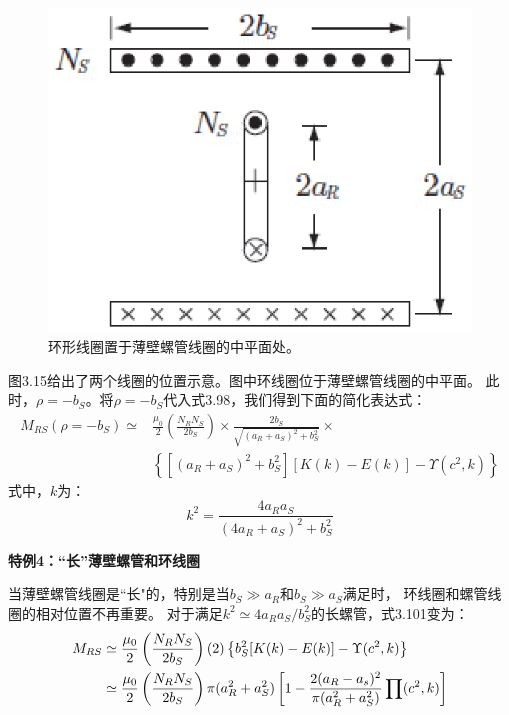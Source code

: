 \begin{figure}[htbp]
	\centering
	\includegraphics[scale=0.7]{chpt3/figs/fig3.15.eps}
	\caption{环形线圈置于薄壁螺管线圈的中平面处。}
\end{figure}

图3.15给出了两个线圈的位置示意。图中环线圈位于薄壁螺管线圈的中平面。
此时，$\rho=-b_S$。将$\rho=-b_S$代入式3.98，我们得到下面的简化表达式：
  \begin{equation}
  \begin{split}
M_{RS}(\rho=-b_S)\simeq & \frac{\mu_0}{2}\left(\frac{N_R N_S}{2b_S}\right)\times\frac{2b_S}{\sqrt{(a_R+a_S)^2+b_S^2}}\times\\
&\left\{[(a_R+a_S)^2+b_S^2][K(k)-E(k)]-\Upsilon(c^2,k)\right\}
\end{split}
\end{equation}
式中，$k$为：
  \begin{equation*}
k^2=\frac{4a_Ra_S}{(4a_R+a_S)^2+b_S^2}
\end{equation*}

\textbf{特例4：``长''薄壁螺管和环线圈} 

当薄壁螺管线圈是``长"的，特别是当$b_S\gg a_R$和$b_S\gg a_S$满足时，
环线圈和螺管线圈的相对位置不再重要。
对于满足$k^2\simeq 4a_R a_S/b_S^2$的长螺管，式3.101变为：
\begin{align}
M_{RS}&\simeq\frac{\mu_0}{2}\left(\frac{N_RN_S}{2b_S}\right)(2)\left\{b_S^2[K(k)-E(k)]-\Upsilon(c^2,k)\right\}\\\notag
&\simeq\frac{\mu_0}{2}\left(\frac{N_RN_S}{2b_S}\right)\pi(a_R^2+a_S^2)\left[1-\frac{2(a_R-a_s)^2}{\pi(a_R^2+a_S^2)}\prod(c^2,k)\right] 
\end{align}

